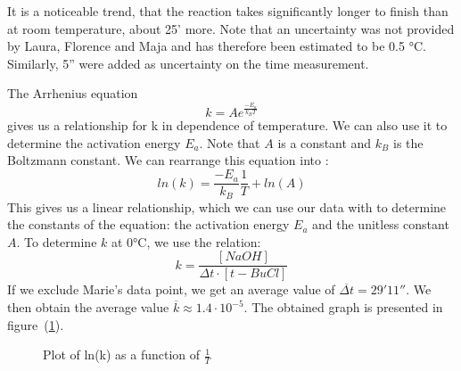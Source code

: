 \documentclass[12pt]{article}
\begin{document}
\noindent It is a noticeable trend, that the reaction takes significantly longer to finish than at room temperature, about 25' more. Note that an uncertainty was not provided by Laura, Florence and Maja and has therefore been estimated to be 0.5 °C. Similarly, 5'' were added as uncertainty on the time measurement.

\noindent The Arrhenius equation \begin{equation}
    k = Ae^{\frac{-E_a}{k_B T}} 
    \label{arrhenius}
\end{equation} gives us a relationship for k in dependence of temperature. We can also use it to determine the activation energy $E_a$. Note that $A$ is a constant and $k_B$ is the Boltzmann constant. We can rearrange this equation into \cite{arrhenius}: \begin{equation}
    ln(k) = \frac{-E_a}{k_B} \frac{1}{T} + ln(A)
    \label{arrheniusRewrite}
\end{equation} This gives us a linear relationship, which we can use our data with to determine the constants of the equation: the activation energy $E_a$ and the unitless constant $A$. To determine $k$ at 0°C, we use the relation: \begin{equation}
    k = \frac{[NaOH]}{\Delta t \cdot [t-BuCl]}
\end{equation} If we exclude Marie's data point, we get an average value of $\overline{\Delta t} = 29'11''$. We then obtain the average value $\overline{k} \approx 1.4 \cdot 10^{-5}$. The obtained graph is presented in figure~(\ref{fig:arrhenius}).

\begin{figure}[!ht]
    \centering
    \caption{Plot of ln(k) as a function of $\frac{1}{T}$}
    \label{fig:arrhenius}
\end{figure}
\end{document}
